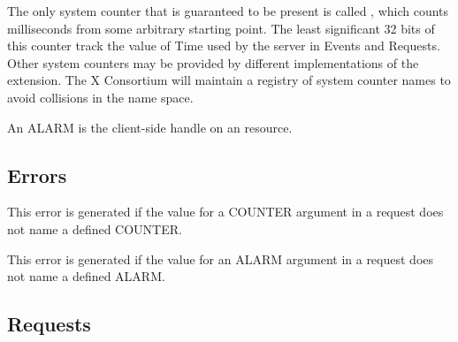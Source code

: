 The only system counter that is guaranteed to be present is called
, which counts milliseconds from some arbitrary starting
point. The least significant 32 bits of this counter track the value of Time
used by the server in Events and Requests. Other system counters may be
provided by different implementations of the extension. The X Consortium will
maintain a registry of system counter names to avoid collisions in the
name space.

An ALARM is the client-side handle on an  resource.

\subsection{Errors}

\begin{description}


This error is generated if the value for a COUNTER argument in a request does
not name a defined COUNTER.


This error is generated if the value for an ALARM argument in a request does
not name a defined ALARM.

\end{description}

\subsection{Requests}

